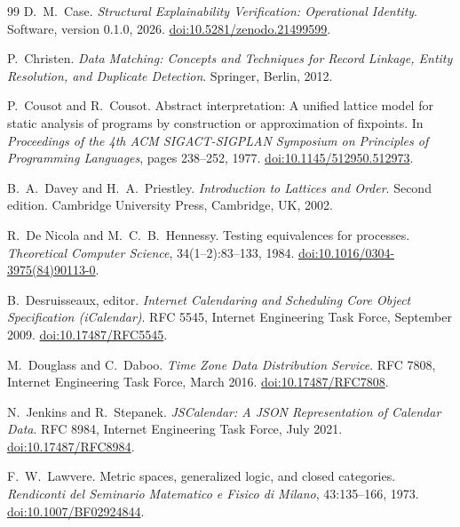 \documentclass[11pt]{article}
\theoremstyle{plain}
\theoremstyle{definition}
\theoremstyle{remark}
\begin{document}
\begin{thebibliography}{99}
  D.\ M.\ Case.
  \emph{Structural Explainability Verification: Operational Identity}.
  Software, version 0.1.0, 2026.
  \href{https://doi.org/10.5281/zenodo.21499599}{doi:10.5281/zenodo.21499599}.

  P.\ Christen.
  \emph{Data Matching: Concepts and Techniques for Record Linkage, Entity Resolution, and Duplicate Detection}.
  Springer, Berlin, 2012.

  P.\ Cousot and R.\ Cousot.
  Abstract interpretation:
  A unified lattice model for static analysis of programs
  by construction or approximation of fixpoints.
  In \emph{Proceedings of the 4th ACM SIGACT-SIGPLAN Symposium on Principles of Programming Languages},
  pages 238--252, 1977.
  \href{https://doi.org/10.1145/512950.512973}{doi:10.1145/512950.512973}.

  B.\ A.\ Davey and H.\ A.\ Priestley.
  \emph{Introduction to Lattices and Order}.
  Second edition.
  Cambridge University Press, Cambridge, UK, 2002.

  R.\ De Nicola and M.\ C.\ B.\ Hennessy.
  Testing equivalences for processes.
  \emph{Theoretical Computer Science}, 34(1--2):83--133, 1984.
  \href{https://doi.org/10.1016/0304-3975(84)90113-0}{doi:10.1016/0304-3975(84)90113-0}.

  B.\ Desruisseaux, editor.
  \emph{Internet Calendaring and Scheduling Core Object Specification (iCalendar)}.
  RFC 5545, Internet Engineering Task Force, September 2009.
  \href{https://doi.org/10.17487/RFC5545}{doi:10.17487/RFC5545}.

  M.\ Douglass and C.\ Daboo.
  \emph{Time Zone Data Distribution Service}.
  RFC 7808, Internet Engineering Task Force, March 2016.
  \href{https://doi.org/10.17487/RFC7808}{doi:10.17487/RFC7808}.

  N.\ Jenkins and R.\ Stepanek.
  \emph{JSCalendar: A JSON Representation of Calendar Data}.
  RFC 8984, Internet Engineering Task Force, July 2021.
  \href{https://doi.org/10.17487/RFC8984}{doi:10.17487/RFC8984}.

  F.\ W.\ Lawvere.
  Metric spaces, generalized logic, and closed categories.
  \emph{Rendiconti del Seminario Matematico e Fisico di Milano},
  43:135--166, 1973.
  \href{https://doi.org/10.1007/BF02924844}{doi:10.1007/BF02924844}.


\end{thebibliography}
\end{document}
